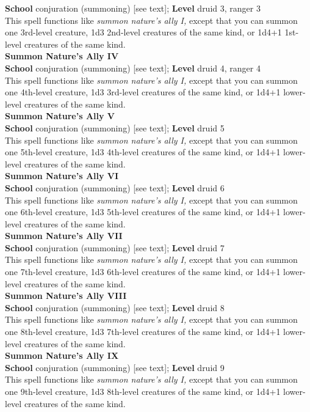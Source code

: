 \textbf{School} conjuration (summoning) [see text]; \textbf{Level} druid 3, ranger 3\\
This spell functions like \textit{summon nature's ally I, }except that you can summon one 3rd-level creature, 1d3 2nd-level creatures of the same kind, or 1d4+1 1st-level creatures of the same kind.\\
\textbf{Summon Nature's Ally IV}\\
\textbf{School} conjuration (summoning) [see text]; \textbf{Level} druid 4, ranger 4\\
This spell functions like \textit{summon nature's ally I, }except that you can summon one 4th-level creature, 1d3 3rd-level creatures of the same kind, or 1d4+1 lower-level creatures of the same kind.\\
\textbf{Summon Nature's Ally V}\\
\textbf{School} conjuration (summoning) [see text]; \textbf{Level} druid 5\\
This spell functions like \textit{summon nature's ally I, }except that you can summon one 5th-level creature, 1d3 4th-level creatures of the same kind, or 1d4+1 lower-level creatures of the same kind.\\
\textbf{Summon Nature's Ally VI}\\
\textbf{School} conjuration (summoning) [see text]; \textbf{Level} druid 6\\
This spell functions like \textit{summon nature's ally I, }except that you can summon one 6th-level creature, 1d3 5th-level creatures of the same kind, or 1d4+1 lower-level creatures of the same kind.\\
\textbf{Summon Nature's Ally VII}\\
\textbf{School} conjuration (summoning) [see text]; \textbf{Level} druid 7\\
This spell functions like \textit{summon nature's ally I, }except that you can summon one 7th-level creature, 1d3 6th-level creatures of the same kind, or 1d4+1 lower-level creatures of the same kind.\\
\textbf{Summon Nature's Ally VIII}\\
\textbf{School} conjuration (summoning) [see text]; \textbf{Level} druid 8\\
This spell functions like \textit{summon nature's ally I, }except that you can summon one 8th-level creature, 1d3 7th-level creatures of the same kind, or 1d4+1 lower-level creatures of the same kind.\\
\textbf{Summon Nature's Ally IX}\\
\textbf{School} conjuration (summoning) [see text]; \textbf{Level} druid 9\\
This spell functions like \textit{summon nature's ally I, }except that you can summon one 9th-level creature, 1d3 8th-level creatures of the same kind, or 1d4+1 lower-level creatures of the same kind.\\

